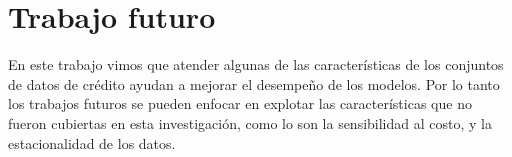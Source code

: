 
\section{Trabajo futuro}

En este trabajo vimos que atender algunas de las características de los conjuntos de datos de crédito ayudan a mejorar el desempeño de los modelos. Por lo tanto los trabajos futuros se pueden enfocar en explotar las características que no fueron cubiertas en esta investigación, como lo son la sensibilidad al costo, y la estacionalidad de los datos.


